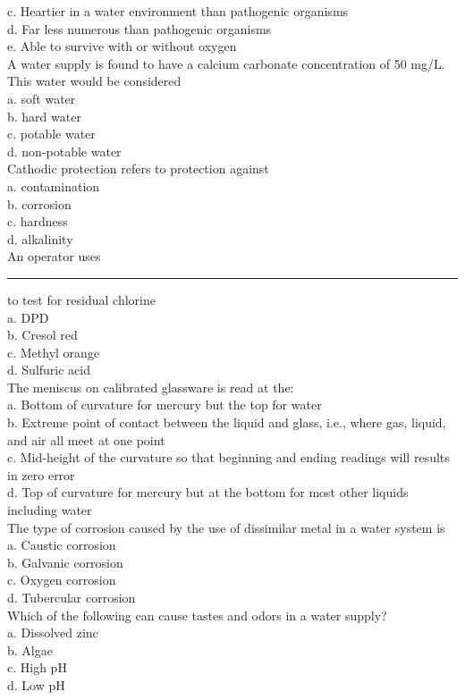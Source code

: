 c. Heartier in a water environment than pathogenic organisms\\
d. Far less numerous than pathogenic organisms\\
e. Able to survive with or without oxygen\\
A water supply is found to have a calcium carbonate concentration of 50 mg/L. This water would be considered\\
a.	soft water\\
b.	hard water\\
c.	potable water\\
d.	non-potable water\\
Cathodic protection refers to protection against\\
a.	contamination\\
b.	corrosion\\
c.	hardness\\
d.  alkalinity\\
An operator uses \rule{1.5cm}{0.3pt} to test for residual chlorine\\
a. DPD\\
b. Cresol red\\
c. Methyl orange\\
d. Sulfuric acid\\
The meniscus on calibrated glassware is read at the:\\
a. Bottom of curvature for mercury but the top for water\\
b. Extreme point of contact between the liquid and glass, i.e., where gas, liquid, and air all meet at one point\\
c. Mid-height of the curvature so that beginning and ending readings will results in zero error\\
d. Top of curvature for mercury but at the bottom for most other liquids including water\\
The type of corrosion caused by the use of dissimilar metal in a water system is\\
a. Caustic corrosion\\
b. Galvanic corrosion\\
c. Oxygen corrosion\\
d. Tubercular corrosion\\
Which of the following can cause tastes and odors in a water supply?\\
a. Dissolved zinc\\
b. Algae\\
c. High pH\\
d. Low pH\\
